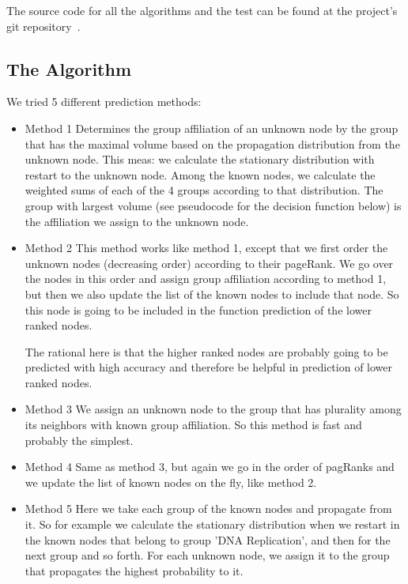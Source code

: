 The source code for all the algorithms and the test can be found at
the project's git repository~\cite{project_git}.

\subsection*{The Algorithm}

We tried 5 different prediction methods:

\begin{itemize}
\item{Method 1} Determines the group affiliation of an unknown node
by the group that has the maximal volume based on the propagation
distribution from the unknown node. This meas: we calculate the
stationary distribution with restart to the unknown node. Among the
known nodes, we calculate the weighted sums of each of the 4 groups
according to that distribution. The group with largest volume (see
pseudocode for the decision function below) is the affiliation we
assign to the unknown node.


\item{Method 2} This method works like method 1, except that we first order the
unknown nodes (decreasing order) according to their pageRank. We go over the
nodes in this order and assign group affiliation according to method 1, but then
we also update the list of the known nodes to include that node. So this node is
going to be included in the function prediction of the lower ranked nodes.

The rational here is that the higher ranked nodes are probably going to be
predicted with high accuracy and therefore be helpful in prediction of lower
ranked nodes. 
%

\item{Method 3} We assign an unknown node to the group that has plurality among
its neighbors with known group affiliation. So this method is fast and
probably the simplest.

\item{Method 4} Same as method 3, but again we go in the order of pagRanks and
we update the list of known nodes on the fly, like method 2.

\item{Method 5} Here we take each group of the known nodes and propagate from
it. So for example we calculate the stationary distribution when we restart in
the known nodes that belong to group 'DNA Replication', and then for the next
group and so forth. For each unknown node, we assign it to the group that
propagates the highest probability to it.


\end{itemize}
